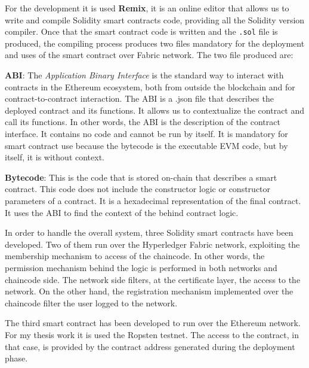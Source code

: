 For the development it is used \textbf{Remix}\cite{remix}, it is an online
editor that allows us to write and compile Solidity smart contracts code, providing all the Solidity 
version compiler. Once that the smart contract code is written and the \texttt{.sol} file is produced, 
the compiling process produces two files mandatory for the deployment and uses of the smart contract over 
Fabric network. 
The two file produced are: 
\begin{outline}
    \1 \textbf{ABI}: The \textit{Application Binary Interface} is the standard way to interact with contracts 
    in the Ethereum ecosystem, both from outside the blockchain and for contract-to-contract interaction. The 
    ABI is a .json file that describes the deployed contract and its functions. It allows us to contextualize 
    the contract and call its functions. In other words, the ABI is the description of the contract interface. 
    It contains no code and cannot be run by itself. It is mandatory for smart contract use because the bytecode 
    is the executable EVM code, but by itself, it is without context.

    \1 \textbf{Bytecode}: This is the code that is stored on-chain that describes a smart contract. 
    This code does not include the constructor logic or constructor parameters of a contract. 
    It is a hexadecimal representation of the final contract. It uses the ABI to find the 
    context of the behind contract logic. 
\end{outline}

\bigskip

In order to handle the overall system, three Solidity smart contracts have been developed. Two of them run over the Hyperledger 
Fabric network, exploiting the membership mechanism to access of the chaincode.
In other words, the permission mechanism behind the logic is performed in both networks and chaincode side. 
The network side filters, at the certificate layer, the access to the network. On the other hand, the registration 
mechanism implemented over the chaincode filter the user logged to the network. 
\bigskip

The third smart contract has been developed to run over the Ethereum network. For my thesis work it is used the Ropsten 
testnet. The access to the contract, in that case, is provided by the contract address generated during the deployment 
phase. 
\bigskip

